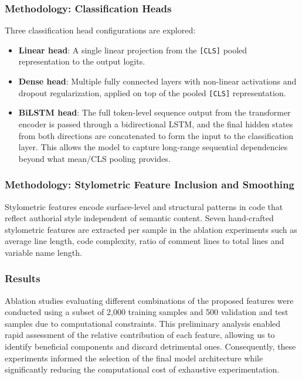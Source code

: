 \documentclass[11pt]{article}
\begin{document}
\subsubsection{Methodology: Classification Heads}
Three classification head configurations are explored:

\begin{itemize}
    \item \textbf{Linear head}: A single linear projection from the \texttt{[CLS]}
    pooled representation to the output logits.
    \item \textbf{Dense head}: Multiple fully connected layers with non-linear
    activations and dropout regularization, applied on top of the pooled
    \texttt{[CLS]} representation.
    \item \textbf{BiLSTM head}: The full token-level sequence output from the
    transformer encoder is passed through a bidirectional LSTM, and the final
    hidden states from both directions are concatenated to form the input to
    the classification layer. This allows the model to capture long-range
    sequential dependencies beyond what mean/CLS pooling provides.
\end{itemize}
\subsubsection{Methodology: Stylometric Feature Inclusion and Smoothing}
Stylometric features encode surface-level and structural patterns in code that
reflect authorial style independent of semantic content. Seven hand-crafted
stylometric features are extracted per sample in the ablation experiments such as average line length, code complexity, ratio of comment lines to total lines and variable name length.
\subsubsection{Results}
Ablation studies evaluating different combinations of the proposed features were conducted using a subset of 2,000 training samples and 500 validation and test samples due to computational constraints. This preliminary analysis enabled rapid assessment of the relative contribution of each feature, allowing us to identify beneficial components and discard detrimental ones. Consequently, these experiments informed the selection of the final model architecture while significantly reducing the computational cost of exhaustive experimentation.
\end{document}
